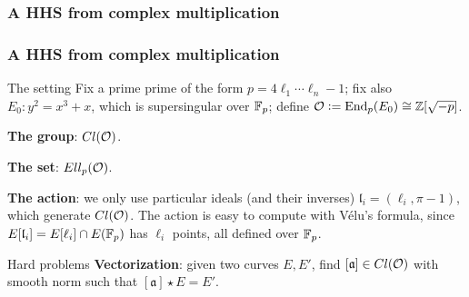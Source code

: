 \documentclass{beamer}
\begin{document}
    \begin{frame}
    \frametitle{A HHS from complex multiplication}
    
    \begin{center}
    \end{center}
    
    \end{frame}


    \begin{frame}
        \frametitle{A HHS from complex multiplication}
        
        \begin{block}{The setting}
            Fix a prime prime of the form $p=4\ell_1\cdots\ell_n-1$; fix also $E_0:y^2=x^3+x$, which is supersingular over $\mathbb{F}_p$; define $\mathcal{O}:=\operatorname{End}_p(E_0)\cong\mathbb{Z}[\sqrt{-p}]$.
            
            \textbf{The group}: $Cl(\mathcal{O})$.
            
            \textbf{The set}: $Ell_p(\mathcal{O})$.
            
            \textbf{The action}: we only use particular ideals (and their inverses) $\mathfrak{l}_i=(\ell_i,\pi-1)$, which generate $Cl(\mathcal{O})$. The action is easy to compute with Vélu's formula, since $E[\mathfrak{l}_i]=E[\ell_i]\cap E(\mathbb{F}_p)$ has $\ell_i$ points, all defined over $\mathbb{F}_p$.
        \end{block}
    
        \begin{block}{Hard problems}
            \textbf{Vectorization}: given two curves $E,E'$, find $[\mathfrak{a}]\in Cl(\mathcal{O})$ with smooth norm such that $[\mathfrak{a}]\star E = E'$.       
        \end{block}
    
    \end{frame}
\end{document}
